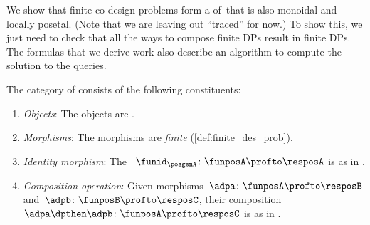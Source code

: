 We show that finite co-design problems form a  of~\DP that is also monoidal and locally posetal.
(Note that we are leaving out ``traced'' for now.) To show this, we just need to check that all the ways to compose finite DPs result in finite DPs.
The formulas that we derive work also describe an algorithm to compute the solution to the queries.
\begin{definition}
    \label{def:DPfinite}
    The category of  \DPfinite consists of the following constituents:
    \begin{enumerate}
        \item \emph{Objects}: The objects are .
        \item \emph{Morphisms}: The morphisms are \emph{finite}  (\cref{def:finite_des_prob}).
        \item \emph{Identity morphism}: The ~$\funid_\posgenA \colon \funposA \profto \resposA$ is as in \DP.
        \item \emph{Composition operation}: Given morphisms~$\adpa \colon  \funposA \profto \resposB$ and~$\adpb \colon \funposB \profto \resposC$, their composition~$\adpa \dpthen \adpb\colon \funposA\profto \resposC$ is as in \DP.
    \end{enumerate}
\end{definition}

